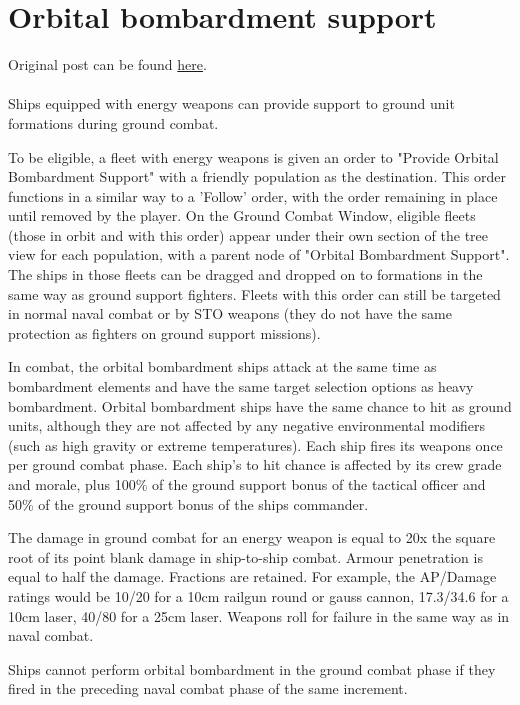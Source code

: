 \documentclass[../../Aurora C# unofficial manual.tex]{subfiles}
\begin{document}
	\section{Orbital bombardment support}\label{orbital_bombardment_support}
	Original post can be found
	\href{http://aurora2.pentarch.org/index.php?topic=8495.msg110310#msg110310}{here}.
	\\\\
	
	Ships equipped with energy weapons can provide support to ground unit formations during ground combat.
	
	To be eligible, a fleet with energy weapons is given an order to "Provide Orbital Bombardment Support" with a friendly population as the destination. This order functions in a similar way to a 'Follow' order, with the order remaining in place until removed by the player. On the Ground Combat Window, eligible fleets (those in orbit and with this order) appear under their own section of the tree view for each population, with a parent node of "Orbital Bombardment Support". The ships in those fleets can be dragged and dropped on to formations in the same way as ground support fighters. Fleets with this order can still be targeted in normal naval combat or by STO weapons (they do not have the same protection as fighters on ground support missions).
	
	In combat, the orbital bombardment ships attack at the same time as bombardment elements and have the same target selection options as heavy bombardment. Orbital bombardment ships have the same chance to hit as ground units, although they are not affected by any negative environmental modifiers (such as high gravity or extreme temperatures). Each ship fires its weapons once per ground combat phase. Each ship's to hit chance is affected by its crew grade and morale, plus 100\% of the ground support bonus of the tactical officer and 50\% of the ground support bonus of the ships commander.
	
	The damage in ground combat for an energy weapon is equal to 20x the square root of its point blank damage in ship-to-ship combat. Armour penetration is equal to half the damage. Fractions are retained. For example, the AP/Damage ratings would be 10/20 for a 10cm railgun round or gauss cannon, 17.3/34.6 for a 10cm laser, 40/80 for a 25cm laser. Weapons roll for failure in the same way as in naval combat.
	
	Ships cannot perform orbital bombardment in the ground combat phase if they fired in the preceding naval combat phase of the same increment.
	
\end{document}

